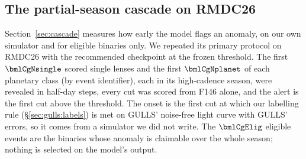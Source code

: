 \subsection{The partial-season cascade on RMDC26}\label{sec:gulls:cascade}
Section~\ref{sec:cascade} measures how early the model flags an anomaly, on our own simulator and for
eligible binaries only. We repeated its primary protocol on RMDC26 with the recommended checkpoint at the
frozen threshold. The first $\bmlCgNsingle$ scored single lenses and the first $\bmlCgNplanet$ of each planetary class
(by event identifier), each in its high-cadence season, were revealed in half-day steps, every cut was scored
from F146 alone, and the alert is the first cut above the threshold. The onset is the first cut at which our labelling rule (\S\ref{sec:gulls:labels}) is met on
GULLS' noise-free light curve with GULLS' errors, so it comes from a simulator we did not write. The
$\bmlCgElig$ eligible events are the binaries whose anomaly is claimable over the whole season; nothing is
selected on the model's output.

